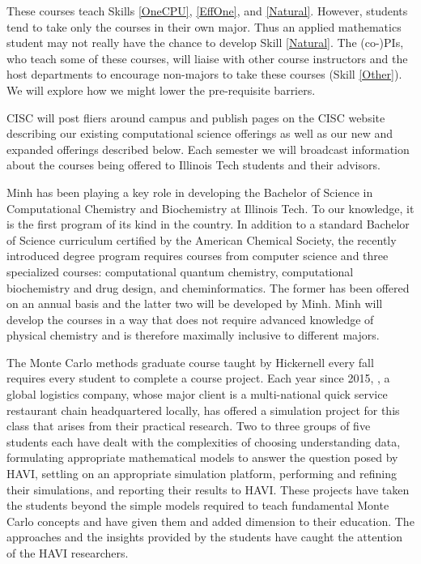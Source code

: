 \documentclass[11pt]{NSFamsart}
\begin{document}
These courses teach Skills \ref{OneCPU}, \ref{EffOne}, and \ref{Natural}.  However, students tend to take only the courses in their own major.  Thus an applied mathematics student may not really have the chance to develop Skill \ref{Natural}.  The (co-)PIs, who teach some of these courses, will liaise  with other course instructors and the host departments to encourage non-majors to take these courses (Skill \ref{Other}).  We will explore how we might lower the pre-requisite barriers. 

CISC will post fliers around campus and publish pages on the CISC website describing our existing computational science offerings as well as our new and expanded offerings described below.  Each semester we will broadcast information about the courses being offered to Illinois Tech students and their advisors.

Minh has been playing a key role in developing the Bachelor of Science in Computational Chemistry and Biochemistry at Illinois Tech. To our knowledge, it is the first program of its kind in the country. In addition to a standard Bachelor of Science curriculum certified by the American Chemical Society, the recently introduced degree program requires courses from computer science and three specialized courses: computational quantum chemistry, computational biochemistry and drug design, and cheminformatics. The former has been offered on an annual basis and the latter two will be developed by Minh. Minh will develop the courses in a way that does not require advanced knowledge of physical chemistry and is therefore maximally inclusive to different majors.

The Monte Carlo methods graduate course taught by Hickernell every fall requires every student to complete a course project.  Each year since 2015, \HAVI, a global logistics company, whose major client is a multi-national quick service restaurant chain headquartered locally, has offered a simulation project for this class that arises from their practical research.  Two to three groups of five students each have dealt with the complexities of choosing understanding data, formulating appropriate mathematical models to answer the question posed by HAVI, settling on an appropriate simulation platform, performing and refining their simulations, and reporting their results to HAVI.  These projects have taken the students beyond the simple models required to teach fundamental Monte Carlo concepts and have given them and added dimension to their education.  The approaches and the insights provided by the students have caught the attention of the HAVI researchers.
\end{document}
